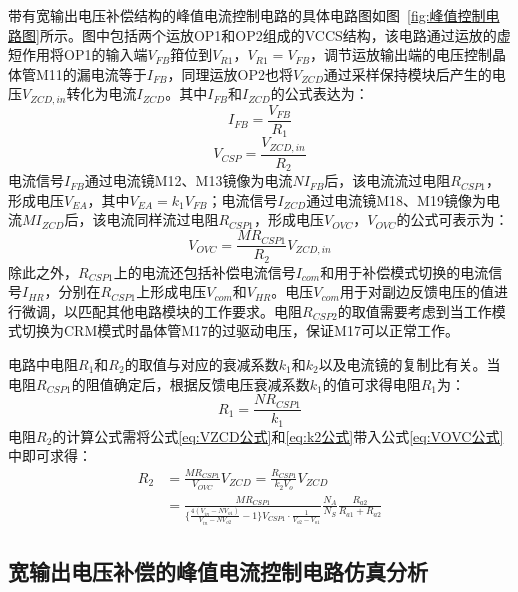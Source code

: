带有宽输出电压补偿结构的峰值电流控制电路的具体电路图如图~\ref{fig:峰值控制电路图}所示。图中包括两个运放OP1和OP2组成的VCCS结构，该电路通过运放的虚短作用将OP1的输入端$V_{FB}$箝位到$V_{R1}$，$V_{R1}=V_{FB}$，调节运放输出端的电压控制晶体管M11的漏电流等于$I_{FB}$，同理运放OP2也将$V_{ZCD}$通过采样保持模块后产生的电压$V_{ZCD,in}$转化为电流$I_{ZCD}$。其中$I_{FB}$和$I_{ZCD}$的公式表达为：
\begin{equation}
    \label{eq:IFB公式}
    I_{FB} = \frac{V_{FB}}{R_1}
\end{equation}
\begin{equation}
    \label{eq:IZCD公式}
    V_{CSP} = \frac{V_{ZCD,in}}{R_2}
\end{equation}
电流信号$I_{FB}$通过电流镜M12、M13镜像为电流$NI_{FB}$后，该电流流过电阻$R_{CSP1}$，形成电压$V_{EA}$，其中$V_{EA}=k_1V_{FB}$；电流信号$I_{ZCD}$通过电流镜M18、M19镜像为电流$MI_{ZCD}$后，该电流同样流过电阻$R_{CSP1}$，形成电压$V_{OVC}$，$V_{OVC}$的公式可表示为：
\begin{equation}
    \label{eq:VOVC公式}
    V_{OVC} = \frac{MR_{CSP1}}{R_2}  V_{ZCD,in}
\end{equation}
除此之外，$R_{CSP1}$上的电流还包括补偿电流信号$I_{com}$和用于补偿模式切换的电流信号$I_{HR}$，分别在$R_{CSP1}$上形成电压$V_{com}$和$V_{HR}$。电压$V_{com}$用于对副边反馈电压的值进行微调，以匹配其他电路模块的工作要求。电阻$R_{CSP2}$的取值需要考虑到当工作模式切换为CRM模式时晶体管M17的过驱动电压，保证M17可以正常工作。

电路中电阻$R_1$和$R_2$的取值与对应的衰减系数$k_1$和$k_2$以及电流镜的复制比有关。当电阻$R_{CSP1}$的阻值确定后，根据反馈电压衰减系数$k_1$的值可求得电阻$R_1$为：
\begin{equation}
    \label{eq:R1公式}
    R_1 = \frac{NR_{CSP1}}{k_1}
\end{equation}
电阻$R_2$的计算公式需将公式\eqref{eq:VZCD公式}和\eqref{eq:k2公式}带入公式\eqref{eq:VOVC公式}中即可求得：
\begin{align}
    \label{eq:R2公式}
    R_2 &= \frac{MR_{CSP1}}{V_{OVC}}  V_{ZCD} = \frac{R_{CSP1}}{k_2 V_o}  V_{ZCD}
    \\  &= \frac{MR_{CSP1}}{\{ \frac{4 (V_{in} - NV_{o1})}{V_{in} - NV_{o2}} - 1 \} V_{CSP1} \cdot \frac{1}{V_{o2} - V_{o1}}}  \frac{N_A}{N_S}\frac{R_{a2}}{R_{a1}+R_{a2}}
\end{align}


\subsection{宽输出电压补偿的峰值电流控制电路仿真分析}




